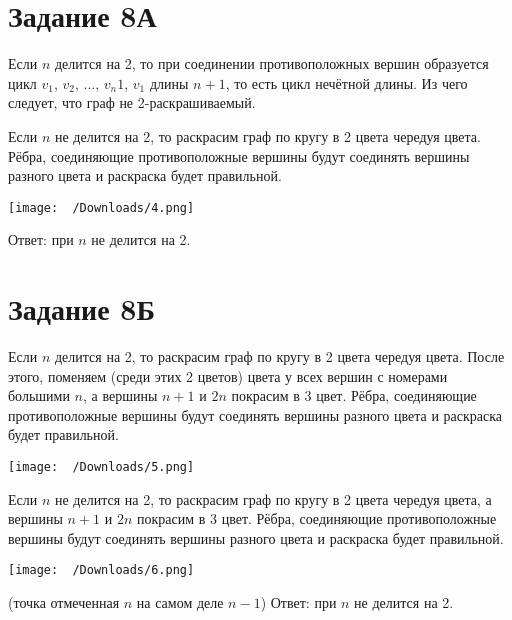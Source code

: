 \documentclass[a4paper, 12pt]{article}
\begin{document}
	\section*{Задание 8А}
		Если $n$ делится на 2, то при соединении противоположных вершин образуется цикл $v_1$, $v_2$, ..., $v_n1$, $v_1$ длины $n+1$, то есть цикл нечётной длины. Из чего следует, что граф не 2-раскрашиваемый.\par
		Если $n$ не делится на 2, то раскрасим граф по кругу в 2 цвета чередуя цвета. Рёбра, соединяющие противоположные вершины будут соединять вершины разного цвета и раскраска будет правильной.
		\par\texttt{[image: ~/Downloads/4.png]}\par
		Ответ: при $n$ не делится на 2.
	\section*{Задание 8Б}
		Если $n$ делится на 2, то раскрасим граф по кругу в 2 цвета чередуя цвета. После этого, поменяем (среди этих 2 цветов) цвета у всех вершин с номерами большими $n$, а вершины $n+1$ и $2n$ покрасим в 3 цвет. Рёбра, соединяющие противоположные вершины будут соединять вершины разного цвета и раскраска будет правильной.
		\par\texttt{[image: ~/Downloads/5.png]}\par
		Если $n$ не делится на 2, то раскрасим граф по кругу в 2 цвета чередуя цвета, а вершины $n+1$ и $2n$ покрасим в 3 цвет. Рёбра, соединяющие противоположные вершины будут соединять вершины разного цвета и раскраска будет правильной.
		\par\texttt{[image: ~/Downloads/6.png]}\par (точка отмеченная $n$ на самом деле $n-1$)
		Ответ: при $n$ не делится на 2.
\end{document}
